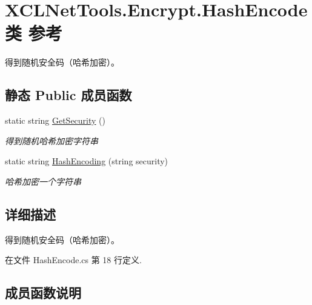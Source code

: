 \hypertarget{class_x_c_l_net_tools_1_1_encrypt_1_1_hash_encode}{}\section{X\+C\+L\+Net\+Tools.\+Encrypt.\+Hash\+Encode类 参考}
\label{class_x_c_l_net_tools_1_1_encrypt_1_1_hash_encode}


得到随机安全码（哈希加密）。  


\subsection*{静态 Public 成员函数}
\begin{DoxyCompactItemize}
\item 
static string \hyperlink{class_x_c_l_net_tools_1_1_encrypt_1_1_hash_encode_aa9bb322a56c4ccb43846364c342286ab}{Get\+Security} ()
\begin{DoxyCompactList}\small\item\em 得到随机哈希加密字符串 \end{DoxyCompactList}\item 
static string \hyperlink{class_x_c_l_net_tools_1_1_encrypt_1_1_hash_encode_a274d0413fc6c3ce6ba24300fab20fee8}{Hash\+Encoding} (string security)
\begin{DoxyCompactList}\small\item\em 哈希加密一个字符串 \end{DoxyCompactList}\end{DoxyCompactItemize}


\subsection{详细描述}
得到随机安全码（哈希加密）。 



在文件 Hash\+Encode.\+cs 第 18 行定义.



\subsection{成员函数说明}
\mbox{\label{class_x_c_l_net_tools_1_1_encrypt_1_1_hash_encode_aa9bb322a56c4ccb43846364c342286ab}} 
